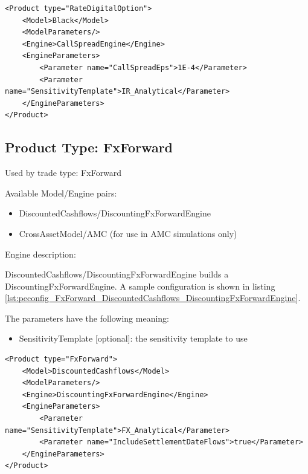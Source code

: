 \begin{longlisting}
\begin{verbatim}
<Product type="RateDigitalOption">
    <Model>Black</Model>
    <ModelParameters/>
    <Engine>CallSpreadEngine</Engine>
    <EngineParameters>
        <Parameter name="CallSpreadEps">1E-4</Parameter>
        <Parameter name="SensitivityTemplate">IR_Analytical</Parameter>
    </EngineParameters>
</Product>
\end{verbatim}
\caption{Configuration for Product RateDigitalOption, Model Black, Engine CallSpreadEngine}
\label{lst:peconfig_RateDigitalOption_Black_CallSpreadEngine}
\end{longlisting}

\subsection{Product Type: FxForward}

Used by trade type: FxForward

Available Model/Engine pairs:

\begin{itemize}
\item DiscountedCashflows/DiscountingFxForwardEngine
\item CrossAssetModel/AMC (for use in AMC simulations only)
\end{itemize}

Engine description:

DiscountedCashflows/DiscountingFxForwardEngine builds a DiscountingFxForwardEngine. A sample configuration is shown in
listing \ref{lst:peconfig_FxForward_DiscountedCashflows_DiscountingFxForwardEngine}.

The parameters have the following meaning:

\begin{itemize}
\item SensitivityTemplate [optional]: the sensitivity template to use
\end{itemize}

\begin{longlisting}
\begin{verbatim}
<Product type="FxForward">
    <Model>DiscountedCashflows</Model>
    <ModelParameters/>
    <Engine>DiscountingFxForwardEngine</Engine>
    <EngineParameters>
        <Parameter name="SensitivityTemplate">FX_Analytical</Parameter>
        <Parameter name="IncludeSettlementDateFlows">true</Parameter>
    </EngineParameters>
</Product>
\end{verbatim}
\caption{Configuration for Product FxForward, Model DiscountedCashflows, Engine DiscountingFxForwardEngine}
\label{lst:peconfig_FxForward_DiscountedCashflows_DiscountingFxForwardEngine}
\end{longlisting}


